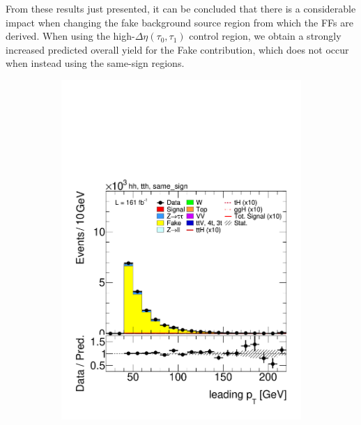 From these results just presented, it can be concluded that there is a considerable impact when changing the fake \tauhad background source region from which the FFs are derived. When using the high-$\Delta\eta(\tau_0,\tau_1)$ control region, we obtain a strongly increased predicted overall yield for the Fake contribution, which does not occur when instead using the same-sign regions.
\begin{figure}[htbp]
  \centering
  \begin{subfigure}[b]{0.45\textwidth}
    \centering
    \includegraphics[width=\textwidth]{images/same_sign_same_sign_run3/plot_tau_0_pt_hh_tth_22_23_24_same_sign.pdf}
    \caption{}
  \end{subfigure}
  \hfill
  \begin{subfigure}[b]{0.45\textwidth}
    \centering

\end{subfigure}
\end{figure}
